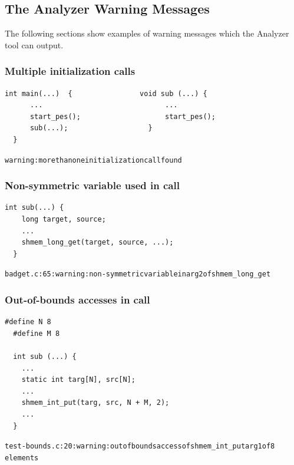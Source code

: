 \subsection{The \openshmem Analyzer Warning Messages}

The following sections show examples of warning messages which the Analyzer tool can
output.

\vspace{0.2in}

\begin{minipage}{\linewidth}
\subsubsection{Multiple \openshmem initialization calls}

\begin{lstlisting}[language=OSH+C]
  int main(...)  {                void sub (...) {
      ...                             ...
      start_pes();                    start_pes();       
      sub(...);                   } 
  }
\end{lstlisting}
\begin{alltt}
  warning: more than one \openshmem initialization call found
\end{alltt}
\end{minipage}

\vspace{0.2in}

\begin{minipage}{\linewidth}
\subsubsection{Non-symmetric variable used in \openshmem call}

\begin{lstlisting}[language=OSH+C]
  int sub(...) {
    long target, source;
    ...
    shmem_long_get(target, source, ...);
  }
\end{lstlisting}
\begin{alltt}
  badget.c:65: warning: non-symmetric variable in arg2 of shmem_long_get
\end{alltt}
\end{minipage}

\vspace{0.2in}

\begin{minipage}{\linewidth}
\subsubsection{Out-of-bounds accesses in \openshmem call}

\begin{lstlisting}[language=OSH+C]
  #define N 8
  #define M 8

  int sub (...) {
    ...
    static int targ[N], src[N];
    ...
    shmem_int_put(targ, src, N + M, 2);
    ...
  }
\end{lstlisting}
\begin{alltt}
  test-bounds.c:20: warning: out of bounds access of shmem_int_put arg1 of 8
  elements
\end{alltt}
\end{minipage}

